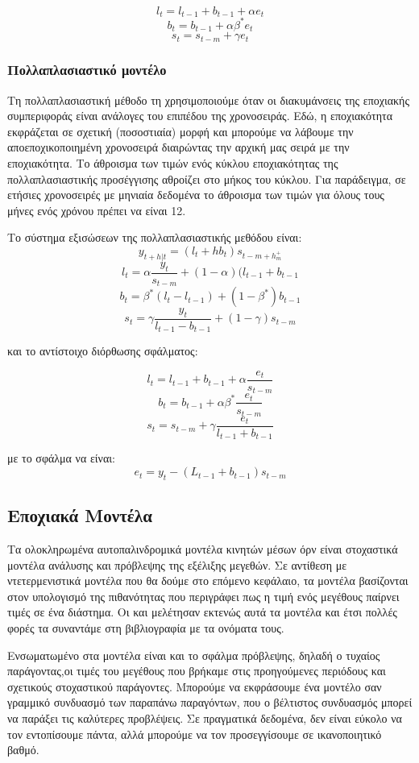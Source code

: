 \[l_t = l_{t-1} + b_{t-1} + \alpha e_t\]
\[b_t = b_{t-1} + \alpha \beta^* e_t\]
\[s_t = s_{t-m} + \gamma e_t\]

\subsubsection{Πολλαπλασιαστικό μοντέλο }

Τη πολλαπλασιαστική μέθοδο τη χρησιμοποιούμε όταν οι διακυμάνσεις της εποχιακής συμπεριφοράς είναι ανάλογες του επιπέδου της χρονοσειράς. 
Εδώ, η εποχιακότητα εκφράζεται σε σχετική (ποσοστιαία) μορφή και μπορούμε να λάβουμε την αποεποχικοποιημένη χρονοσειρά διαιρώντας την αρχική μας σειρά με την εποχιακότητα.
Το άθροισμα των τιμών ενός κύκλου εποχιακότητας της πολλαπλασιαστικής προσέγγισης αθροίζει στο μήκος του κύκλου. Για παράδειγμα, σε ετήσιες χρονοσειρές με μηνιαία δεδομένα το άθροισμα των τιμών για όλους τους μήνες ενός χρόνου πρέπει να είναι 12.

Το σύστημα εξισώσεων της πολλαπλασιαστικής μεθόδου είναι:
\[ y_{t+h|t} = (l_t + hb_t)  s_{t-m+h^+_m}\]
\[l_t = \alpha\frac{y_t}{s_{t-m}} + (1 - \alpha)(l_{t-1} + b_{t-1}\]
\[b_t = \beta^*(l_t - l_{t-1}) + (1-\beta^*)b_{t-1}\]
\[s_t = \gamma\frac{y_t }{ l_{t-1} - b_{t-1}} + (1-\gamma)s_{t-m}\]

και το αντίστοιχο διόρθωσης σφάλματος:

\[l_t = l_{t-1} + b_{t-1} + \alpha \frac{e_t}{s_{t-m}}\]
\[b_t = b_{t-1} + \alpha \beta^* \frac{e_t}{s_{t-m}}\]
\[s_t = s_{t-m} + \gamma \frac{e_t}{l_{t-1}+b_{t-1}}\]

με το σφάλμα να είναι:
\[e_t = y_t - (L_{t-1} + b_{t-1}) s_{t-m} \]

\subsection{Εποχιακά Μοντέλα }

Τα ολοκληρωμένα αυτοπαλινδρομικά μοντέλα κινητών μέσων όρν  είναι στοχαστικά μοντέλα ανάλυσης και πρόβλεψης της εξέλιξης μεγεθών. Σε αντίθεση με ντετερμενιστικά μοντέλα που θα δούμε στο επόμενο κεφάλαιο, τα μοντέλα  βασίζονται στον υπολογισμό της πιθανότητας που περιγράφει πως η τιμή ενός μεγέθους παίρνει τιμές σε ένα διάστημα. Οι  και  μελέτησαν εκτενώς αυτά τα μοντέλα και έτσι πολλές φορές τα συναντάμε στη βιβλιογραφία με τα ονόματα τους.

Ενσωματωμένο στα μοντέλα  είναι και το σφάλμα πρόβλεψης, δηλαδή ο τυχαίος παράγοντας,οι τιμές του μεγέθους που βρήκαμε στις προηγούμενες περιόδους και σχετικούς στοχαστικού παράγοντες. Μπορούμε να εκφράσουμε ένα μοντέλο  σαν γραμμικό συνδυασμό των παραπάνω παραγόντων, που ο βέλτιστος συνδυασμός μπορεί να παράξει τις καλύτερες προβλέψεις. Σε πραγματικά δεδομένα, δεν είναι εύκολο να τον εντοπίσουμε πάντα, αλλά μπορούμε να τον προσεγγίσουμε σε ικανοποιητικό βαθμό.

